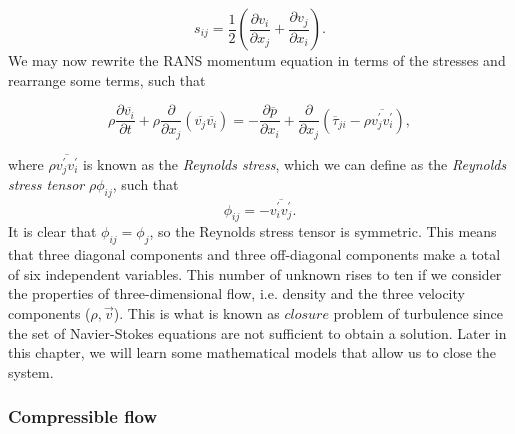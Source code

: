 \begin{equation}
    s_{ij} = \frac{1}{2}\left(\frac{\partial v_i}{\partial x_j}+\frac{\partial v_j
    }{\partial x_i}\right).
\end{equation}
We may now rewrite the RANS momentum equation in terms of the stresses and rearrange some terms, such that
\begin{eqBox}
\begin{equation}
    \rho \frac{\partial \overline{v_i}}{\partial t} 
    + \rho  \frac{\partial}{\partial x_j} \left(\overline{v_j}\overline{v_i}\right)
    =- \frac{\partial \overline{p}}{\partial x_i} 
    + \frac{\partial}{\partial x_j} \left(\overline\tau_{ji} - \rho \overline{v_j^\prime v_i^\prime}\right),
\end{equation}
\end{eqBox}
where $\rho \overline{v_j^\prime v_i^\prime}$ is known as the \textit{Reynolds stress}, which we can define as the \textit{Reynolds stress tensor} $\rho\phi_{ij}$, such that
\begin{equation}
    \phi_{ij} = -\overline{v_i^\prime v_j^\prime}.
\end{equation}
It is clear that $\phi_{ij}=\phi_{j}$, so the Reynolds stress tensor is symmetric. This means that three diagonal components and three off-diagonal components make a total of six independent variables. This number of unknown rises to ten if we consider the properties of three-dimensional flow, i.e. density and the three velocity components ($\rho, \vec{v}$). This is what is known as $closure$ problem of turbulence since the set of Navier-Stokes equations are not sufficient to obtain a solution. Later in this chapter, we will learn some mathematical models that allow us to close the system.

\subsubsection{Compressible flow}

